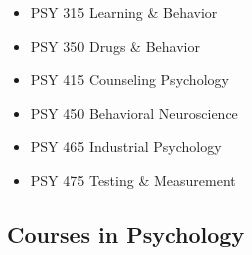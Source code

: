 \documentclass[
  letterpaper,
]{scrbook}
\providecommand{\tightlist}{%
  \setlength{\itemsep}{0pt}\setlength{\parskip}{0pt}}
\begin{document}
\begin{enumerate}
  \begin{itemize}
  \tightlist
  \item
    PSY 315 Learning \& Behavior
  \item
    PSY 350 Drugs \& Behavior
  \item
    PSY 415 Counseling Psychology
  \item
    PSY 450 Behavioral Neuroscience
  \item
    PSY 465 Industrial Psychology
  \item
    PSY 475 Testing \& Measurement
  \end{itemize}
\end{enumerate}

\subsection{Courses in Psychology}\label{courses-in-psychology}
\end{document}
